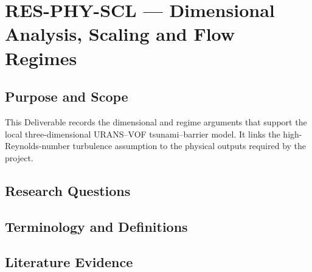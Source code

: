 
\section{RES-PHY-SCL --- Dimensional Analysis, Scaling and Flow Regimes}
\label{sec:res-phy-scl}

\subsection{Purpose and Scope}
\label{sec:res-phy-scl-purpose}


This Deliverable records the dimensional and regime arguments that
support the local three-dimensional URANS--VOF tsunami--barrier model.
It links the high-Reynolds-number turbulence assumption to the physical
outputs required by the project.

\subsection{Research Questions}
\label{sec:res-phy-scl-research-questions}


\subsection{Terminology and Definitions}
\label{sec:res-phy-scl-definitions}


\subsection{Literature Evidence}
\label{sec:res-phy-scl-literature-evidence}

